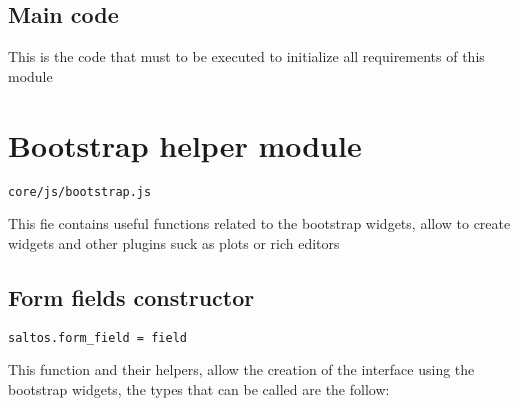 \documentclass[a4paper]{book}
\begin{document}
\hypertarget{toc366}{}
\subsection{Main code}

This is the code that must to be executed to initialize all requirements of this module

\hypertarget{toc367}{}
\section{Bootstrap helper module}

\begin{lstlisting}
core/js/bootstrap.js
\end{lstlisting}

This fie contains useful functions related to the bootstrap widgets, allow to create widgets and
other plugins suck as plots or rich editors

\hypertarget{toc368}{}
\subsection{Form fields constructor}

\begin{lstlisting}
saltos.form_field = field
\end{lstlisting}

This function and their helpers, allow the creation of the interface using the bootstrap
widgets, the types that can be called are the follow:
\end{document}
